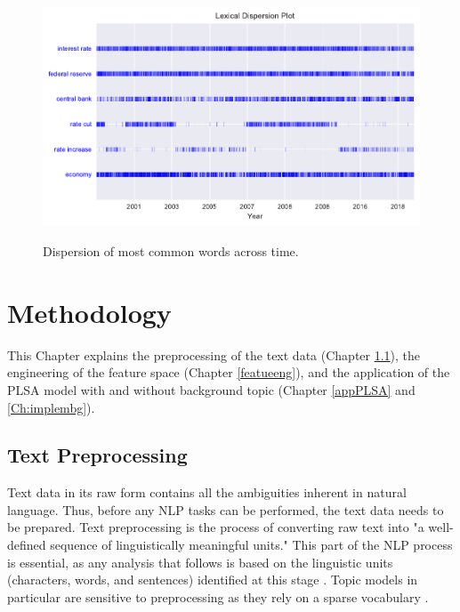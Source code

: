 \documentclass[11pt,a4paper,english,oneside]{book}
\numberwithin{equation}{chapter}
\begin{document}
\begin{figure}
	\caption{Dispersion of most common words across time.}
	\centering
	\includegraphics[scale=1]{Images/dispersionplot.pdf}
	\label{dispersion}
\end{figure}

	


\section{Methodology}\label{methodology}

This Chapter explains the preprocessing of the text data (Chapter  \ref{preprocessing}), the engineering of the feature space (Chapter \ref{featueeng}), and the application of the PLSA model with and without background topic (Chapter \ref{appPLSA} and \ref{Ch:implembg}).


\subsection{Text Preprocessing}\label{preprocessing}
Text data in its raw form contains all the ambiguities inherent in natural language. Thus, before any NLP tasks can be performed, the text data needs to be prepared. Text preprocessing is the process of converting raw text into "a well-defined sequence of linguistically meaningful units." This part of the NLP process is essential, as any analysis that follows is based on the linguistic units (characters, words, and sentences) identified at this stage \cite[p. 9]{Palmer.2010}. Topic models in particular are sensitive to preprocessing as they rely on a sparse vocabulary \cite[p. 288]{Schofield.2016}.
\end{document}
